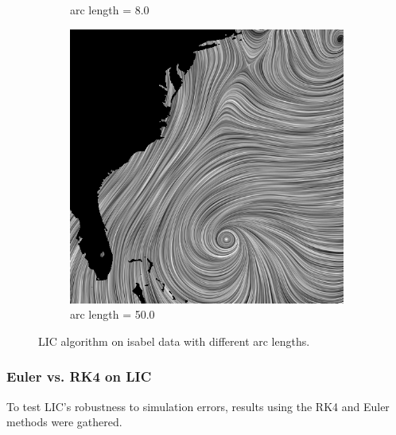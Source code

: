 \documentclass{article}
\begin{document}
\begin{figure}[h!]
\begin{subfigure}{0.30\textwidth}
        \caption{arc length = 8.0}
    \end{subfigure}
    \hfill
    \begin{subfigure}{0.30\textwidth}
        \centering
        \includegraphics[width=\textwidth]{LIC_isabel_arc_length_50.png}
        \caption{arc length = 50.0}
    \end{subfigure}
    \caption{LIC algorithm on isabel data with different arc lengths.}
\end{figure}

\subsubsection{Euler vs. RK4 on LIC}
To test LIC's robustness to simulation errors, results using the RK4 and Euler methods were gathered.
 
\end{document}
